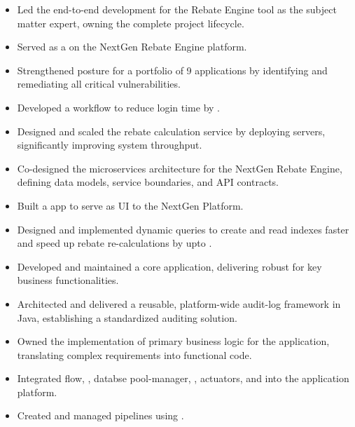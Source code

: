 \documentclass[10pt,a4paper,ragged2e, normalphoto]{altacv}
\begin{document}
\begin{itemize}
  \item Led the end-to-end development for the Rebate Engine tool as the subject matter expert, owning the complete project lifecycle.
  \item Served as a  on the NextGen Rebate Engine platform.
  \item Strengthened  posture for a portfolio of 9 applications by identifying and remediating all critical vulnerabilities.
  \item Developed a  workflow to reduce login time by .
  \item Designed and scaled the rebate calculation service by deploying  servers, significantly improving system throughput.
  \item Co-designed the microservices architecture for the NextGen Rebate Engine, defining data models, service boundaries, and API contracts.
  \item Built a  app to serve as UI to the NextGen Platform.
  \item Designed and implemented dynamic  queries to create and read indexes faster and speed up rebate re-calculations by upto .
\end{itemize}
\begin{itemize}
	\item Developed and maintained a core  application, delivering robust  for key business functionalities.
	\item Architected and delivered a reusable, platform-wide audit-log framework in Java, establishing a standardized auditing solution.
	\item Owned the implementation of primary business logic for the application, translating complex requirements into functional code.
	\item Integrated  flow, , databse pool-manager, , actuators, and  into the application platform.
	\item Created and managed  pipelines using .
 \end{itemize}
\end{document}
